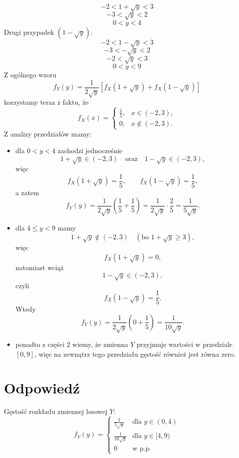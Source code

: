 \documentclass[polish, 10pt]{extarticle}
\theoremstyle{definition}
\begin{document}
\begin{equation*}
-2 < 1 + \sqrt{y} < 3
\end{equation*}
\begin{equation*}
-3 < \sqrt{y} < 2
\end{equation*}
\begin{equation*}
0 < y < 4
\end{equation*}
Drugi przypadek $(1-\sqrt{y})$:
\begin{equation*}
-2 < 1 - \sqrt{y} < 3
\end{equation*}
\begin{equation*}
-3 < - \sqrt{y} < 2
\end{equation*}
\begin{equation*}
-2 < \sqrt{y} < 3
\end{equation*}
\begin{equation*}
0 < y < 9
\end{equation*}
Z ogólnego wzoru
\[
    f_Y(y) = \frac{1}{2\sqrt{y}} \left[ f_X(1+\sqrt{y}) + f_X(1-\sqrt{y}) \right]
\]
korzystamy teraz z faktu, że
\[
    f_X(x) = \begin{cases}
        \frac{1}{5}, & x \in (-2,3),\\
        0, & x \notin (-2,3).
    \end{cases}
\]
Z analizy przedziałów mamy:
\begin{itemize}
    \item dla \(0 < y < 4\) zachodzi jednocześnie
    \[
        1+\sqrt{y} \in (-2,3) \quad \text{oraz} \quad 1-\sqrt{y} \in (-2,3),
    \]
    więc
    \[
        f_X(1+\sqrt{y}) = \frac{1}{5}, \qquad f_X(1-\sqrt{y}) = \frac{1}{5},
    \]
    a zatem
    \[
        f_Y(y) = \frac{1}{2\sqrt{y}}\left( \frac{1}{5} + \frac{1}{5} \right)
        = \frac{1}{2\sqrt{y}} \cdot \frac{2}{5}
        = \frac{1}{5\sqrt{y}}.
    \]
    \item dla \(4 \le y < 9\) mamy
    \[
        1+\sqrt{y} \notin (-2,3) \quad (\text{bo } 1+\sqrt{y} \ge 3),
    \]
    więc
    \[
        f_X(1+\sqrt{y}) = 0,
    \]
    natomiast wciąż
    \[
        1-\sqrt{y} \in (-2,3),
    \]
    czyli
    \[
        f_X(1-\sqrt{y}) = \frac{1}{5}.
    \]
    Wtedy
    \[
        f_Y(y) = \frac{1}{2\sqrt{y}}\left( 0 + \frac{1}{5} \right)
        = \frac{1}{10\sqrt{y}}.
    \]
    \item ponadto z części 2 wiemy, że zmienna \(Y\) przyjmuje wartości w przedziale \([0,9]\), więc na zewnątrz tego przedziału gęstość również jest równa zero.
\end{itemize}

\section*{Odpowiedź}
Gęstość rozkładu zmiennej losowej $Y$:
\begin{equation*}
    f_Y(y) = \begin{cases} 
        \frac{1}{5\sqrt{y}} & \text{dla } y \in (0, 4) \\[1em]
        \frac{1}{10\sqrt{y}} & \text{dla } y \in [4, 9) \\[1em]
        0 & \text{w p.p.}
    \end{cases}
\end{equation*}
\end{document}
